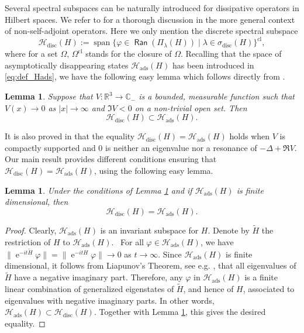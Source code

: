 \documentclass{article}
\def\C{\mathbb C}
\def\H{\mathcal H}
\def\R{\mathbb R}
\def\e{\mathop{\mathrm{e}}\nolimits}
\def\Ran{\mathop{\mathsf{Ran}}\nolimits}
\def\Span{\mathop{\mathrm{span}}\nolimits}
\def\disc{{\mathrm{disc}}}
\def\cl{{\mathrm{cl}}}
\def\ads{{\mathrm{ads}}}
\newtheorem{Lemma}[Theorem]{Lemma}
\begin{document}
 Several spectral subspaces can be naturally introduced for dissipative operators in Hilbert spaces. We refer to \cite{FaFr23} for a thorough discussion in the more general context of non-self-adjoint operators. Here we only mention the discrete spectral subspace
 \begin{equation*}
 \H_\disc(H):=\Span \big\{ \varphi \in \Ran(\Pi_\lambda(H))\mid \lambda\in\sigma_\disc(H) \big \}^\cl,
 \end{equation*}
where for a set $\Omega$, $\Omega^\cl$ stands for the closure of $\Omega$. Recalling that the space of asymptotically disappearing states $\H_\ads(H)$ has been introduced in \eqref{eq:def_Hads}, we have the following easy lemma which follows directly from \cite[Prop. 5.6]{FaFr23}.

\begin{Lemma}\label{lm:Hdisc-sub-Hads}
Suppose that $V:\R^3\to \C_-$ is a bounded, measurable function such that  $V(x)\to0$ as $|x|\to\infty$ and $\Im V<0$ on a non-trivial open set. Then
$$
\H_\disc(H)\subset\H_\ads(H).
$$
\end{Lemma}

It is also proved in \cite[Thm. 6.1]{FaFr18} that the equality $\H_\disc(H)=\H_\ads(H)$ holds when $V$ is compactly supported 
and $0$ is neither an eigenvalue nor a resonance of $-\Delta+\Re V$. 
Our main result provides different conditions ensuring that $\H_\disc(H)=\H_\ads(H)$, using the following easy lemma.

\begin{Lemma}\label{lem:finite-dim}
Under the conditions of Lemma \ref{lm:Hdisc-sub-Hads} and if $\H_\ads(H)$ is finite dimensional, then
$$
\H_\disc(H)=\H_\ads(H).
$$
\end{Lemma}
\begin{proof}
Clearly, $\H_\ads(H)$ is an invariant subspace for $H$. Denote by $\tilde H$ the restriction of $H$ to $\H_\ads(H)$. \
For all $\varphi\in\H_\ads(H)$, we have $\|\e^{-it \tilde H}\varphi\|=\|\e^{-itH}\varphi\|\to0$ as $t\to\infty$. 
Since $\H_\ads(H)$ is finite dimensional, it follows from Liapunov's Theorem, see e.g. \cite[Thm. 2.10]{EngelNagel}, that 
all eigenvalues of $\tilde H$ have a negative imaginary part. 
Therefore, any $\varphi$ in $\H_\ads(H)$ is a finite linear combination of generalized eigenstates of $\tilde H$, and hence of $H$, 
associated to eigenvalues with negative imaginary parts. 
In other words, $\H_\ads(H)\subset \H_\disc(H)$. Together with Lemma \ref{lm:Hdisc-sub-Hads}, this gives the desired equality.
\end{proof}
\end{document}
